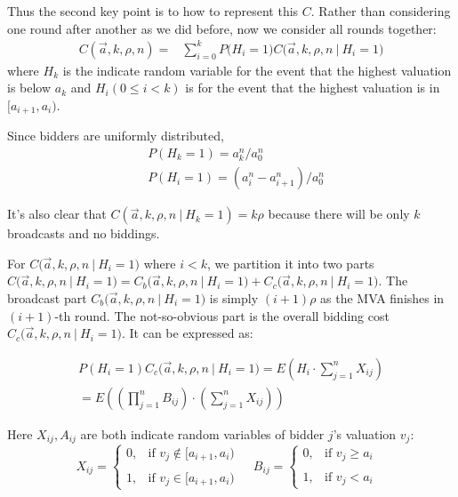 Thus the second key point is to how to represent this $C$. Rather than
considering one round after another as we did before, now we consider all
rounds together:
\begin{align*}
C(\vec a, k, \rho, n) =
&\sum_{i=0}^k P\big(H_i = 1\big) C\big(\vec a, k, \rho, n ~\big|~ H_i = 1 \big)
\end{align*}
where $H_k$ is the indicate random variable for the event that the highest
valuation is below $a_k$ and $H_i(0 \leq i < k)$ is for the event that the highest
valuation is in $[a_{i+1}, a_i)$.

Since bidders are uniformly distributed,
\begin{align*}
  &P(H_k = 1) = a_k^n / a_0^n\\
    &P(H_i = 1) = (a_{i}^n-a_{i+1}^n) / a_0^n
\end{align*}

It's also clear that $C(\vec a, k, \rho, n ~\big|~ H_k = 1) = k\rho$ because
there will be only $k$ broadcasts and no biddings.

For $C\big(\vec a, k, \rho, n ~\big|~ H_i = 1\big)$ where $i < k$, we partition
it into two parts $C\big(\vec a, k, \rho, n ~\big|~ H_i = 1\big) = C_b\big(\vec
a, k, \rho, n ~\big|~ H_i = 1\big) + C_c\big(\vec a, k, \rho, n ~\big|~ H_i =
1\big)$. The broadcast part $C_b\big(\vec a, k, \rho, n ~\big|~ H_i = 1 \big)$
is simply $(i+1)\rho$ as the MVA finishes in $(i+1)$-th round. The
not-so-obvious part is the overall bidding cost $C_c\big(\vec a, k, \rho, n
~\big|~ H_i = 1 \big)$. It can be expressed as:

\begin{align*}
P(H_i = 1)C_c\big(\vec a, k, \rho, n ~\big|~ H_i = 1 \big) = E\left( H_i \cdot
    \sum_{j=1}^n X_{ij}\right) \\
= E\left( \left( \prod_{j=1}^n B_{ij} \right) \cdot \left(\sum_{j=1}^n X_{ij}
    \right) \right)
\end{align*}

Here $X_{ij}, A_{ij}$ are both indicate random variables of bidder $j$'s valuation $v_j$:
$$
X_{ij} = \begin{cases}
    0, &\mbox{if $v_j \notin [a_{i+1}, a_{i})$ } \\\\
    1, &\mbox{if $v_j \in [a_{i+1}, a_{i})$}
\end{cases}
~~
B_{ij} = \begin{cases}
    0, &\mbox{if $v_j \geq a_{i}$ } \\\\
    1, &\mbox{if $v_j < a_{i}$}
\end{cases}
$$

